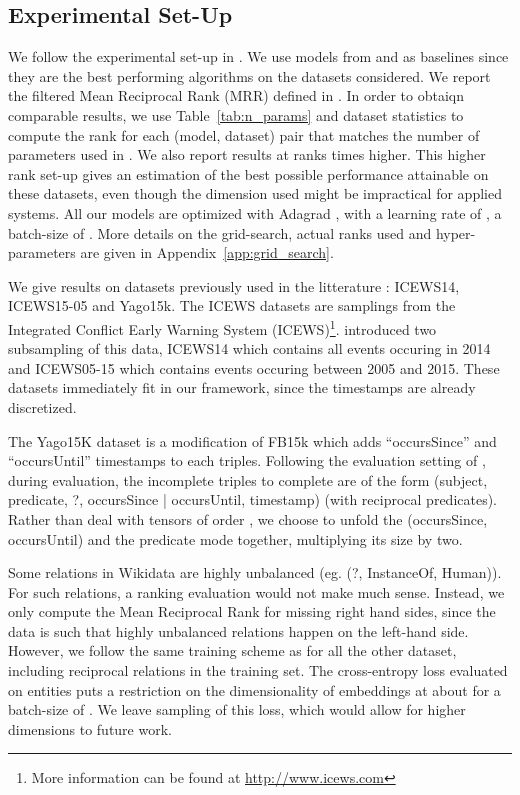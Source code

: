 \documentclass{article}
\begin{document}
\subsection{Experimental Set-Up}
\label{sec:exp}
We follow the experimental set-up in \citet{garcia2018learning, goel2019diachronic}. We use models from \citet{garcia2018learning} and \citet{goel2019diachronic} as baselines since they are the best performing algorithms on the datasets considered. We report the filtered Mean Reciprocal Rank (MRR) defined in \citet{nickel_holographic_2015}. In order to obtaiqn comparable results, we use Table~\ref{tab:n_params} and dataset statistics to compute the rank for each (model, dataset) pair that matches the number of parameters used in \citet{goel2019diachronic}. We also report results at ranks  times higher. This higher rank set-up gives an estimation of the best possible performance attainable on these datasets, even though the dimension used might be impractical for applied systems. All our models are optimized with Adagrad \citep{duchi_adaptive_2011}, with a learning rate of , a batch-size of . More details on the grid-search, actual ranks used and hyper-parameters are given in Appendix~\ref{app:grid_search}.

We give results on  datasets previously used in the litterature : ICEWS14, ICEWS15-05 and Yago15k. The ICEWS datasets are samplings from the  Integrated Conflict Early Warning System (ICEWS)\citep{icewsdataset}\footnote{More information can be found at \url{http://www.icews.com}}.\citet{garcia2018learning} introduced two subsampling of this data, ICEWS14 which contains all events occuring in 2014 and ICEWS05-15 which contains events occuring between 2005 and 2015. These datasets immediately fit in our framework, since the timestamps are already discretized.

The Yago15K dataset \citep{garcia2018learning} is a modification of FB15k \citep{bordes_translating_2013} which adds ``occursSince'' and ``occursUntil'' timestamps to each triples. Following the evaluation setting of \citet{garcia2018learning}, during evaluation, the incomplete triples to complete are of the form (subject, predicate, ?, {occursSince | occursUntil}, timestamp) (with reciprocal predicates). Rather than deal with tensors of order , we choose to unfold the (occursSince,  occursUntil) and the predicate mode together, multiplying its size by two.

Some relations in Wikidata are highly unbalanced (eg. (?, InstanceOf, Human)). For such relations, a ranking evaluation would not make much sense. Instead, we only compute the Mean Reciprocal Rank for missing right hand sides, since the data is such that highly unbalanced relations happen on the left-hand side. However, we follow the same training scheme as for all the other dataset, including reciprocal relations in the training set. The cross-entropy loss evaluated on  entities puts a restriction on the dimensionality of embeddings at about  for a batch-size of . We leave sampling of this loss, which would allow for higher dimensions to future work.
\end{document}
